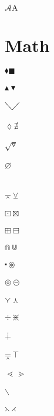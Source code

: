 \documentclass{article}
\begin{document}
$\mathcal{A} \mathrm{A}$

\section{Math}
$\blacklozenge \blacksquare $\\\\
$\blacktriangle \blacktriangledown $\\\\
$\diagdown \diagup $\\\\
$\lozenge \nexists $\\\\
$\surd \triangledown$\\\\
$\varnothing $\\\\      
\\
$\barwedge \veebar $\\\\
$\boxdot \boxtimes $\\\\
$\boxplus \boxminus $\\\\
$\Cap \Cup $\\\\
$\centerdot \circledast $\\\\
$\circledcirc \circleddash $\\\\
$\curlyvee \curlywedge $\\\\
$\div \divideontimes $\\\\
$\dotplus$\\\\
$\doublebarwedge \intercal$\\\\
$\lessdot \gtrdot $\\\\
$\smallsetminus$\\\\
$\leftthreetimes \rightthreetimes $\\\\
\end{document}

